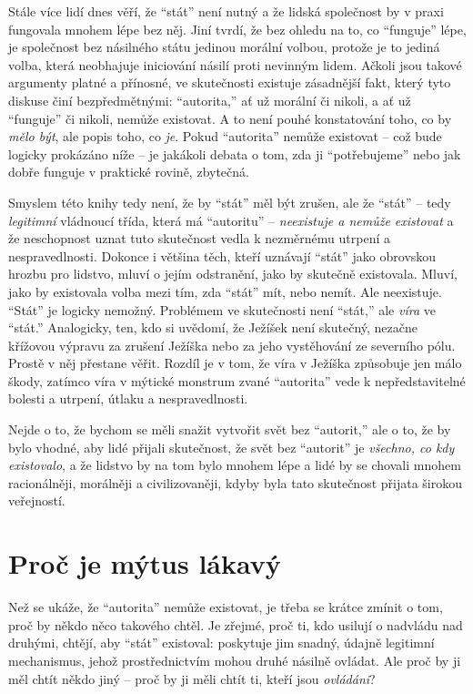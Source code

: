 \documentclass{book}
\begin{document}
Stále více lidí dnes věří, že \enquote{stát} není nutný a že lidská společnost by v praxi fungovala mnohem lépe bez něj. Jiní tvrdí, že bez ohledu na to, co \enquote{funguje} lépe, je společnost bez násilného státu jedinou morální volbou, protože je to jediná volba, která neobhajuje iniciování násilí proti nevinným lidem. Ačkoli jsou takové argumenty platné a přínosné, ve skutečnosti existuje zásadnější fakt, který tyto diskuse činí bezpředmětnými: \enquote{autorita,} ať už morální či nikoli, a ať už \enquote{funguje} či nikoli, nemůže existovat. A to není pouhé konstatování toho, co by \emph{mělo být}, ale popis toho, co \emph{je}. Pokud \enquote{autorita} nemůže existovat -- což bude logicky prokázáno níže -- je jakákoli debata o tom, zda ji \enquote{potřebujeme} nebo jak dobře funguje v praktické rovině, zbytečná.

Smyslem této knihy tedy není, že by \enquote{stát} měl být zrušen, ale že \enquote{stát} -- tedy \emph{legitimní} vládnoucí třída, která má \enquote{autoritu} -- \emph{neexistuje a nemůže existovat} a že neschopnost uznat tuto skutečnost vedla k nezměrnému utrpení a nespravedlnosti. Dokonce i většina těch, kteří uznávají \enquote{stát} jako obrovskou hrozbu pro lidstvo, mluví o jejím odstranění, jako by skutečně existovala. Mluví, jako by existovala volba mezi tím, zda \enquote{stát} mít, nebo nemít. Ale neexistuje. \enquote{Stát} je logicky nemožný. Problémem ve skutečnosti není \enquote{stát,} ale \emph{víra} ve \enquote{stát.} Analogicky, ten, kdo si uvědomí, že Ježíšek není skutečný, nezačne křížovou výpravu za zrušení Ježíška nebo za jeho vystěhování ze severního pólu. Prostě v něj přestane věřit. Rozdíl je v tom, že víra v Ježíška způsobuje jen málo škody, zatímco víra v mýtické monstrum zvané \enquote{autorita} vede k nepředstavitelné bolesti a utrpení, útlaku a nespravedlnosti.

Nejde o to, že bychom se měli snažit vytvořit svět bez \enquote{autorit,} ale o to, že by bylo vhodné, aby lidé přijali skutečnost, že svět bez \enquote{autorit} je \emph{všechno, co kdy existovalo}, a že lidstvo by na tom bylo mnohem lépe a lidé by se chovali mnohem racionálněji, morálněji a civilizovaněji, kdyby byla tato skutečnost přijata širokou veřejností.

\section{Proč je mýtus lákavý}

Než se ukáže, že \enquote{autorita} nemůže existovat, je třeba se krátce zmínit o tom, proč by někdo něco takového chtěl. Je zřejmé, proč ti, kdo usilují o nadvládu nad druhými, chtějí, aby \enquote{stát} existoval: poskytuje jim snadný, údajně legitimní mechanismus, jehož prostřednictvím mohou druhé násilně ovládat. Ale proč by ji měl chtít někdo jiný -- proč by ji měli chtít ti, kteří jsou \emph{ovládáni}?
\end{document}
